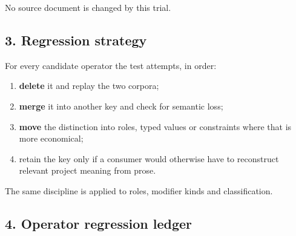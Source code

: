 \documentclass[
  10pt,
  a4paper,
]{article}
\providecommand{\tightlist}{%
  \setlength{\itemsep}{0pt}\setlength{\parskip}{0pt}}
\begin{document}
No source document is changed by this trial.

\subsection{3. Regression strategy}\label{3-regression-strategy}

For every candidate operator the test attempts, in order:

\begin{enumerate}
\def\labelenumi{\arabic{enumi}.}
\tightlist
\item
  \textbf{delete} it and replay the two corpora;
\item
  \textbf{merge} it into another key and check for semantic loss;
\item
  \textbf{move} the distinction into roles, typed values or constraints
  where that is more economical;
\item
  retain the key only if a consumer would otherwise have to reconstruct
  relevant project meaning from prose.
\end{enumerate}

The same discipline is applied to roles, modifier kinds and
classification.

\subsection{4. Operator regression
ledger}\label{4-operator-regression-ledger}
\end{document}
